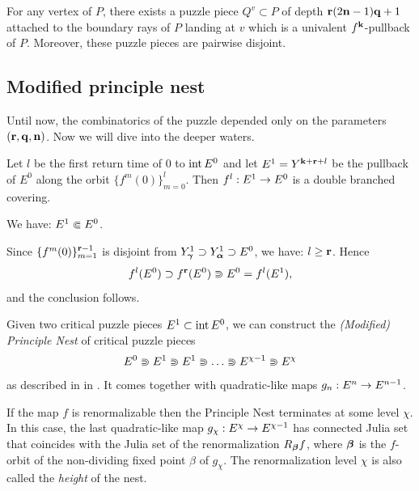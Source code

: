 \begin{lem}\label{Qv}
 For any vertex of $P$, there exists a puzzle piece $Q^v\subset P$ of
 depth ${\mathbf{r}}(2{\mathbf{n}}-1){\mathbf{q}} + 1$ attached to the boundary rays of $P$ landing at $v$
 which is a univalent $f^{\mathbf{k}}$-pullback of $P$. Moreover, these puzzle pieces are
 pairwise disjoint.
\end{lem}


\subsection{Modified principle nest}\label{modified nest}
Until now, the combinatorics of the puzzle depended only on the parameters $({\mathbf{r}},{\mathbf{q}},{\mathbf{n}})$.
Now we will dive  into the deeper waters.

Let $l$ be the first return time of $0$ to $\operatorname{int} E^0$ and let $E^1= Y^{{\mathbf{k}}+ {\mathbf{r}} +l}$
be the pullback of $E^0$ along the orbit $\{f^m (0)\}_{m=0}^l$.
Then $f^l: E^1\rightarrow E^0$ is a double branched covering.

\begin{cor}\label{non-degenerate annulus}
     We have: $E^1\Subset  E^0$.
\end{cor}

\begin{pf}
  Since $\{f^m(0)\}_{m=1}^{{\mathbf{r}}-1}$ is disjoint from $Y_{\mbox{\scriptsize\boldmath$\gamma$} }^1\supset Y_{\mbox{\scriptsize\boldmath$\alpha$} }^1 \supset E^0$,
we have: $l\geq {\mathbf{r}}$. Hence 
$$
      f^l(E^0)\supset f^{\mathbf{r}}(E^0) \Supset E^0 = f^l(E^1),
$$
and the conclusion follows. 
\end{pf}  

 
Given two critical puzzle pieces $E^1\subset \operatorname{int} E^0$, we can construct 
the {\it (Modified) Principle Nest} of critical puzzle pieces 
$$
  E^0\SUPset E^1\SUPset E^1\SUPset\dots\SUPset E^{\chi-1}\SUPset E^\chi 
$$
as described in  in \cite{KL-high}.                        
It comes together with quadratic-like maps $g_n: E^n\rightarrow E^{n-1}$. 

If the map $f$ is renormalizable then  the Principle Nest terminates at some level $\chi$. 
In this case, the last quadratic-like map $g_\chi: E^\chi\rightarrow E^{\chi-1}$  has connected Julia set
that coincides with  the Julia set of the  renormalization $R_{\mbox{\scriptsize\boldmath$\beta$} } f$, where
${\mbox{\boldmath$\beta$} }$ is the $f$-orbit of the non-dividing fixed point $\beta$ of $g_\chi$.  
The renormalization level $\chi$ is also called the {\it height} of the nest. 





